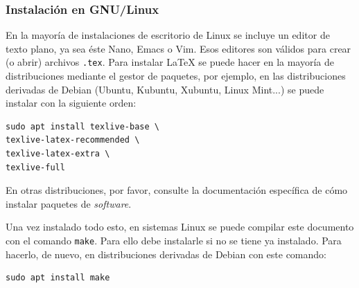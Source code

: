 \documentclass{article}
\begin{document}
\subsubsection{Instalación en GNU/Linux}
En la mayoría de instalaciones de escritorio de Linux se incluye un editor de
texto plano, ya sea éste Nano, Emacs o Vim. Esos editores son válidos para
crear (o abrir) archivos \texttt{.tex}. Para instalar \LaTeX{} se puede hacer
en la mayoría de distribuciones mediante el gestor de paquetes, por ejemplo, en
las distribuciones derivadas de Debian (Ubuntu, Kubuntu, Xubuntu, Linux Mint...)
se puede instalar con la siguiente orden:
\begin{verbatim}
sudo apt install texlive-base \
texlive-latex-recommended \
texlive-latex-extra \
texlive-full
\end{verbatim} 
En otras distribuciones, 
por favor, consulte la documentación específica de cómo instalar paquetes de
\textit{software}.

Una vez instalado todo esto, en sistemas Linux se puede compilar este 
documento con el comando \texttt{make}. Para ello debe instalarle si no se
tiene ya instalado. Para hacerlo, de nuevo, en distribuciones derivadas de
Debian con este comando:
\begin{verbatim}
sudo apt install make
\end{verbatim}
\end{document}
